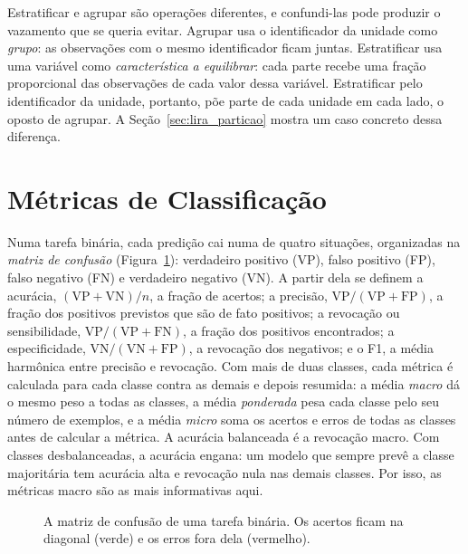 Estratificar e agrupar são operações diferentes, e confundi-las pode produzir o vazamento que se queria evitar. Agrupar usa o identificador da unidade como \emph{grupo}: as observações com o mesmo identificador ficam juntas. Estratificar usa uma variável como \emph{característica a equilibrar}: cada parte recebe uma fração proporcional das observações de cada valor dessa variável. Estratificar pelo identificador da unidade, portanto, põe parte de cada unidade em cada lado, o oposto de agrupar. A Seção~\ref{sec:lira_particao} mostra um caso concreto dessa diferença.

\section{Métricas de Classificação}
\label{sec:auc_background}

Numa tarefa binária, cada predição cai numa de quatro situações, organizadas na \emph{matriz de confusão} (Figura~\ref{fig:confusao}): verdadeiro positivo (VP), falso positivo (FP), falso negativo (FN) e verdadeiro negativo (VN). A partir dela se definem a acurácia, $(\mathrm{VP}+\mathrm{VN})/n$, a fração de acertos; a precisão, $\mathrm{VP}/(\mathrm{VP}+\mathrm{FP})$, a fração dos positivos previstos que são de fato positivos; a revocação ou sensibilidade, $\mathrm{VP}/(\mathrm{VP}+\mathrm{FN})$, a fração dos positivos encontrados; a especificidade, $\mathrm{VN}/(\mathrm{VN}+\mathrm{FP})$, a revocação dos negativos; e o F1, a média harmônica entre precisão e revocação. Com mais de duas classes, cada métrica é calculada para cada classe contra as demais e depois resumida: a média \emph{macro} dá o mesmo peso a todas as classes, a média \emph{ponderada} pesa cada classe pelo seu número de exemplos, e a média \emph{micro} soma os acertos e erros de todas as classes antes de calcular a métrica. A acurácia balanceada é a revocação macro. Com classes desbalanceadas, a acurácia engana: um modelo que sempre prevê a classe majoritária tem acurácia alta e revocação nula nas demais classes. Por isso, as métricas macro são as mais informativas aqui.

\begin{figure}[htpb]
\centering
{}
\caption{A matriz de confusão de uma tarefa binária. Os acertos ficam na diagonal (verde) e os erros fora dela (vermelho).}
\label{fig:confusao}
\end{figure}

